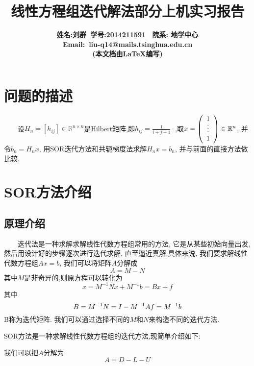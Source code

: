 \documentclass[a4paper]{article}
\begin{document}
\begin{CJK*}{GBK}{song}
\title{\bf{线性方程组迭代解法部分上机实习报告}}
\author{\bf{姓名:刘群\ 学号:2014211591 \ 院系: 地学中心}\\ \bf{Email}:\ liu-q14@mails.tsinghua.edu.cn \\ (本文档由\LaTeX{}编写)}
\maketitle

\section{问题的描述}
\ \ \ \ 设$H_n=[h_{ij}] \in \mathbb{R}^{n \times n}$是Hilbert矩阵,即$h_{ij}=\frac{1}{i+j-1}\cdot$,取$x=\left(
\begin{array}{ccc}
1\\
\rotatebox{90}{$\cdots$} \\
1
\end{array}
\right) \in \mathbb{R}^n$, 并令$b_n=H_nx$, 用SOR迭代方法和共轭梯度法求解$H_nx=b_n$, 并与前面的直接方法做比较.


\section{SOR方法介绍}
\subsection{原理介绍}
\ \ \ \ 迭代法是一种求解求解线性代数方程组常用的方法, 它是从某些初始向量出发, 然后用设计好的步骤逐次进行迭代求解, 直至逼近真解.具体来说, 我们要求解线性代数方程组$Ax=b$, 我们可以将矩阵$A$分解成
\begin{equation}
A=M-N
\end{equation}
其中$M$是非奇异的,则原方程可以转化为
\begin{equation}
x=M^{-1}Nx+M^{-1}b=Bx+f
\end{equation}
其中
\begin{equation}
B=M^{-1}N=I-M^{-1}A \\
f=M^{-1}b
\end{equation}
B称为迭代矩阵. 我们可以通过选择不同的$M$和$N$来构造不同的迭代方法.\par
SOR方法是一种求解线性代数方程组的迭代方法,现简单介绍如下:\par
我们可以把$A$分解为
\begin{equation}
A=D-L-U
\end{equation}


\end{CJK*}
\end{document}
